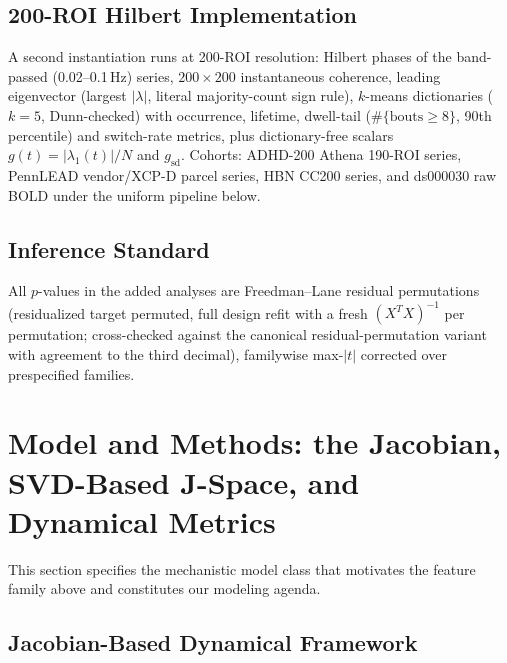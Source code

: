 \documentclass{article}
\begin{document}
\subsection{200-ROI Hilbert Implementation}

A second instantiation runs at 200-ROI resolution: Hilbert phases of the band-passed (0.02--0.1\,Hz) series, $200\times 200$ instantaneous coherence, leading eigenvector (largest $|\lambda|$, literal majority-count sign rule), $k$-means dictionaries ($k{=}5$, Dunn-checked) with occurrence, lifetime, dwell-tail ($\#\{\mathrm{bouts}\ge 8\}$, 90th percentile) and switch-rate metrics, plus dictionary-free scalars $g(t)=|\lambda_1(t)|/N$ and $g_{\mathrm{sd}}$. Cohorts: ADHD-200 Athena 190-ROI series, PennLEAD vendor/XCP-D parcel series, HBN CC200 series, and ds000030 raw BOLD under the uniform pipeline below.

\subsection{Inference Standard}

All $p$-values in the added analyses are Freedman--Lane residual permutations (residualized target permuted, full design refit with a fresh $(X^TX)^{-1}$ per permutation; cross-checked against the canonical residual-permutation variant with agreement to the third decimal), familywise max-$|t|$ corrected over prespecified families.

\section{Model and Methods: the Jacobian, SVD-Based J-Space, and Dynamical Metrics}
\label{sec:jspace-model}

This section specifies the mechanistic model class that motivates the feature family above and constitutes our modeling agenda. 

\subsection{Jacobian-Based Dynamical Framework}
\end{document}
